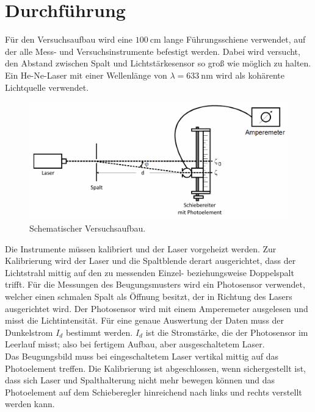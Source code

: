 \section{Durchführung}
\label{sec:Durchführung}

Für den Versuchsaufbau wird eine $\SI{100}{\centi\meter}$ lange Führungsschiene verwendet, auf der alle Mess- und Versuchsinstrumente befestigt werden.
Dabei wird versucht, den Abstand zwischen Spalt und Lichtstärkesensor so groß wie möglich zu halten.
Ein He-Ne-Laser mit einer Wellenlänge von $\lambda = \SI{633}{\nano\meter}$ wird als kohärente Lichtquelle verwendet.

\begin{figure}
    \centering
    \includegraphics[width=\textwidth]{plots/Versuchsaufbau.png}
    \caption{Schematischer Versuchsaufbau.\protect\footnotemark}
    \label{fig:schemAufbau}
\end{figure}

\FloatBarrier

Die Instrumente müssen kalibriert und der Laser vorgeheizt werden.
Zur Kalibrierung wird der Laser und die Spaltblende derart ausgerichtet, dass der Lichtstrahl mittig auf den zu messenden Einzel- beziehungsweise Doppelspalt trifft.
Für die Messungen des Beugungsmusters wird ein Photosensor verwendet, welcher einen schmalen Spalt als Öffnung besitzt, der in Richtung des Lasers ausgerichtet wird.
Der Photosensor wird mit einem Amperemeter ausgelesen und misst die Lichtintensität. Für eine genaue Auswertung der Daten muss der Dunkelstrom $I_d$ bestimmt werden.
$I_d$ ist die Stromstärke, die der Photosensor im Leerlauf misst; also bei fertigem Aufbau, aber ausgeschaltetem Laser.\\
Das Beugungsbild muss bei eingeschaltetem Laser vertikal mittig auf das Photoelement treffen.
Die Kalibrierung ist abgeschlossen, wenn sichergestellt ist, dass sich Laser und Spalthalterung nicht mehr bewegen können und das Photoelement auf dem Schieberegler hinreichend nach links
und rechts verstellt werden kann.\\

